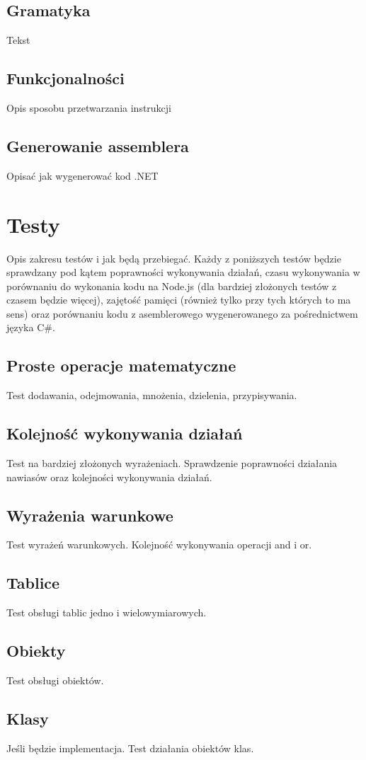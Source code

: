 \documentclass[a4paper]{article}
\begin{document}
\subsection{Gramatyka}
Tekst
\subsection{Funkcjonalności}
Opis sposobu przetwarzania instrukcji
\subsection{Generowanie assemblera}
Opisać jak wygenerować kod .NET

\section{Testy}
Opis zakresu testów i jak będą przebiegać.
Każdy z poniższych testów będzie sprawdzany pod kątem poprawności wykonywania działań, czasu wykonywania w porównaniu do wykonania kodu na Node.js (dla bardziej złożonych testów z czasem będzie więcej), zajętość pamięci (również tylko przy tych których to ma sens) oraz porównaniu kodu z asemblerowego wygenerowanego za pośrednictwem języka C\#.

\subsection{Proste operacje matematyczne}
Test dodawania, odejmowania, mnożenia, dzielenia, przypisywania.
\subsection{Kolejność wykonywania działań}
Test na bardziej złożonych wyrażeniach. Sprawdzenie poprawności działania nawiasów oraz kolejności wykonywania działań.
\subsection{Wyrażenia warunkowe}
Test wyrażeń warunkowych. Kolejność wykonywania operacji and i or.
\subsection{Tablice}
Test obsługi tablic jedno i wielowymiarowych.
\subsection{Obiekty}
Test obsługi obiektów.
\subsection{Klasy}
Jeśli będzie implementacja.
Test działania obiektów klas.
\end{document}

